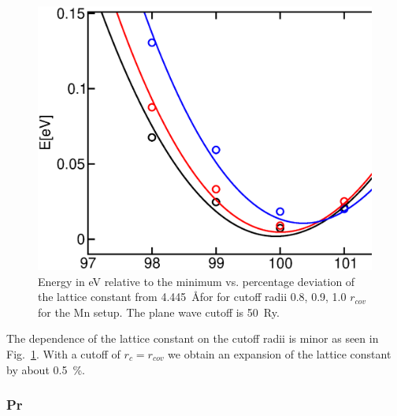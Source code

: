 \documentclass[11pt,a4paper]{report}
\begin{document}
\begin{figure}[!h]
\begin{center}
\includegraphics[width=0.5\linewidth,clip=true]{Figs/Mn_setuptest/mnoevsalat50ry.eps}
\end{center}
\caption{\label{fig:mno_evsalat50ry}Energy in eV relative to the
  minimum vs. percentage deviation of the lattice constant from
  4.445~\AA for for cutoff radii 0.8, 0.9, 1.0 $r_{cov}$ for the Mn
  setup. The plane wave cutoff is 50~Ry.}
\end{figure}
The dependence of the lattice constant on the cutoff radii is minor as
seen in Fig.~\ref{fig:mno_evsalat50ry}. With a cutoff of $r_c=r_{cov}$
we obtain an expansion of the lattice constant by about 0.5~\%.



\subsubsection{Pr}
\end{document}
